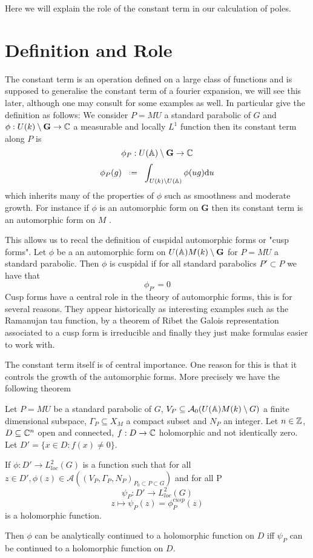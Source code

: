 Here we will explain the role of the constant term in our calculation of poles.

\section{Definition and Role}
The constant term is an operation defined on a large class of functions and is supposed to generalise the constant term of a fourier expansion, we will see this later, although one may consult \cite[1.6]{bumpAutomorphicFormsRepresentations1997} for some examples as well. In particular \cite[I.2.6]{moeglinSpectralDecompositionEisenstein1995} give the definition as follows: We consider \(P=MU\) a standard parabolic of \(G\) and \(\phi: U(k)\setminus \mathbf{G} \to \C\) a measurable and locally \(L^1\) function then its constant term along \(P\) is 
\[\phi_P :  U(\A)\setminus \mathbf{G} \to \C\]
\[\phi_P(g) \defeq \int_{U(k)\setminus U(\A)}\phi(ug) \mathrm{d}u\]
which inherits many of the properties of \(\phi\) such as smoothness and moderate growth. For instance if \(\phi\) is an automorphic form on \(\mathbf{G}\) then its constant term is an automorphic form on \(M\) \cite[6.5]{getzIntroductionAutomorphicRepresentations2024}.

This allows us to recal the definition of cuspidal automorphic forms or "cusp forms". Let \(\phi\) be a an automorphic form on \(U(\A)M(k)\setminus \mathbf{G}\) for \(P = MU\) a standard parabolic. Then \(\phi\) is cuspidal if for all standard parabolics \(P'\subset P\) we have that 
\[\phi_{P'} = 0\]
Cusp forms have a central role in the theory of automorphic forms, this is for several reasons. They appear historically as interesting examples such as the Ramanujan tau function, by a theorem of Ribet \cite[T2.3]{serreProceedingsInternationalConference1977} the Galois representation associated to a cusp form is irreducible and finally they just make formulas easier to work with.

The constant term itself is of central importance. One reason for this is that it controls the growth of the automorphic forms. More precisely we have the following theorem \cite[I.4.10]{moeglinSpectralDecompositionEisenstein1995}

\begin{Theorem}
        Let \(P = MU\) be a standard parabolic of \(G\), \(V_P\subseteq \mathcal{A}_0(U(\A)M(k)\setminus G)\) a finite dimensional subspace, \(\Gamma_P\subseteq X_M\) a compact subset and \(N_P\) an integer. Let \(n\in \Z\), \(D\subseteq \C^n\) open and connected, \(f: D\to \C\) holomorphic and not identically zero. Let \(D' = \{x\in D : f(x)\neq 0\}\).

        If \(\phi: D' \to L^2_{loc}(G)\) is a function such that for all \(z\in D', \phi(z)\in \mathcal{A}((V_P, \Gamma_P, N_P)_{P_0\subset P \subset G})\) and for all P 
        \[\psi_P: D' \to L^2_{loc}(G)\]
        \[z \mapsto \psi_P(z) = \phi_P^{cusp}(z)\]
        is a holomorphic function. 

        Then \(\phi\) can be analytically continued to a holomorphic function on \(D\) iff \(\psi_P\) can be continued to a holomorphic function on \(D\).
    \end{Theorem}
    
